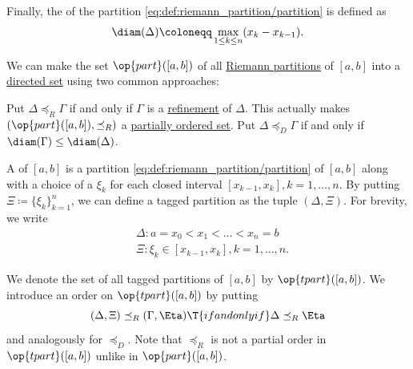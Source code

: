 \begin{definition}
\begin{thmenum}
     Finally, the  of the partition \eqref{eq:def:riemann_partition/partition} is defined as
    \begin{equation}\label{eq:def:riemann_partition/diameter}
      \diam(\Delta) \coloneqq \max_{1 \leq k \leq n} (x_k - x_{k-1}).
    \end{equation}

     We can make the set \( \op{part}([a, b]) \) of all \hyperref[def:riemann_partition/partition]{Riemann partitions} of \( [a, b] \) into a \hyperref[def:directed_set]{directed set} using two common approaches:
    \begin{thmenum}
       Put \( \Delta \preceq_R \Gamma \) if and only if \( \Gamma \) is a \hyperref[def:riemann_partition/refinement]{refinement} of \( \Delta \). This actually makes \( (\op{part}([a, b]), \preceq_R) \) a \hyperref[def:partially_ordered_set]{partially ordered set}.
       Put \( \Delta \preceq_D \Gamma \) if and only if \( \diam(\Gamma) \leq \diam(\Delta) \).
    \end{thmenum}

     A  of \( [a, b] \) is a partition \eqref{eq:def:riemann_partition/partition} of \( [a, b] \) along with a choice of a  \( \xi_k \) for each closed interval \( [x_{k-1}, x_k], k = 1, \ldots, n \). By putting \( \Xi \coloneqq \{ \xi_k \}_{k=1}^n \), we can define a tagged partition as the tuple \( (\Delta, \Xi) \). For brevity, we write
    \begin{equation}\label{eq:def:riemann_partition/tagged}
      \begin{aligned}
        &\Delta: a = x_0 < x_1 < \ldots < x_n = b \\
        &\Xi: \xi_k \in [x_{k-1}, x_k], k = 1, \ldots, n.
      \end{aligned}
    \end{equation}

    We denote the set of all tagged partitions of \( [a, b] \) by \( \op{tpart}([a, b]) \). We introduce an order on \( \op{tpart}([a, b]) \) by putting
    \begin{equation*}
      (\Delta, \Xi) \preceq_R (\Gamma, \Eta) \T{if and only if} \Delta \preceq_R \Eta
    \end{equation*}
    and analogously for \( \preceq_D \). Note that \( \preceq_R \) is not a partial order in \( \op{tpart}([a, b]) \) unlike in \( \op{part}([a, b]) \).
  \end{thmenum}
\end{definition}

